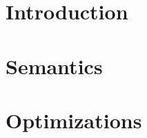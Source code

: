 \documentclass[12pt,letterpaper]{report}
\begin{document}
\chapter{Introduction}

\chapter{Semantics}

\chapter{Optimizations}

\end{document}
